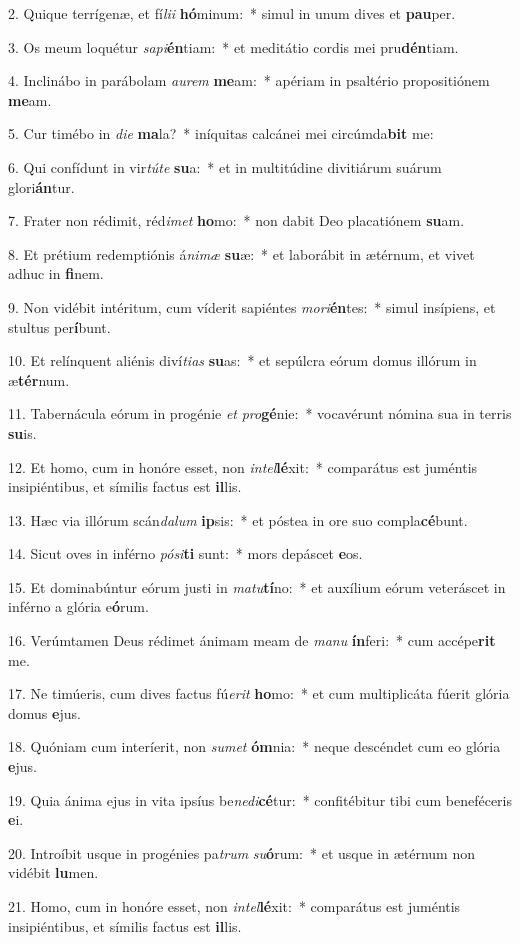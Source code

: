 2. Quique terrígenæ, et fí\textit{li}\textit{i} \textbf{hó}minum:~*  simul in unum dives et \textbf{pau}per.\

3. Os meum loquétur \textit{sa}\textit{pi}\textbf{én}tiam:~*  et meditátio cordis mei pru\textbf{dén}tiam.\

4. Inclinábo in parábolam \textit{au}\textit{rem} \textbf{me}am:~*  apériam in psaltério propositiónem \textbf{me}am.\

5. Cur timébo in \textit{di}\textit{e} \textbf{ma}la?~*  iníquitas calcánei mei circúmda\textbf{bit} me:\

6. Qui confídunt in vir\textit{tú}\textit{te} \textbf{su}a:~*  et in multitúdine divitiárum suárum glori\textbf{án}tur.\

7. Frater non rédimit, réd\textit{i}\textit{met} \textbf{ho}mo:~*  non dabit Deo placatiónem \textbf{su}am.\

8. Et prétium redemptiónis á\textit{ni}\textit{mæ} \textbf{su}æ:~*  et laborábit in ætérnum, et vivet adhuc in \textbf{fi}nem.\

9. Non vidébit intéritum, cum víderit sapiéntes \textit{mo}\textit{ri}\textbf{én}tes:~*  simul insípiens, et stultus per\textbf{í}bunt.\

10. Et relínquent aliénis diví\textit{ti}\textit{as} \textbf{su}as:~*  et sepúlcra eórum domus illórum in æ\textbf{tér}num.\

11. Tabernácula eórum in progénie \textit{et} \textit{pro}\textbf{gé}nie:~*  vocavérunt nómina sua in terris \textbf{su}is.\

12. Et homo, cum in honóre esset, non \textit{in}\textit{tel}\textbf{lé}xit:~*  comparátus est juméntis insipiéntibus, et símilis factus est \textbf{il}lis.\

13. Hæc via illórum scán\textit{da}\textit{lum} \textbf{ip}sis:~*  et póstea in ore suo compla\textbf{cé}bunt.\

14. Sicut oves in inférno \textit{pó}\textit{si}\textbf{ti} sunt:~*  mors depáscet \textbf{e}os.\

15. Et dominabúntur eórum justi in \textit{ma}\textit{tu}\textbf{tí}no:~*  et auxílium eórum veteráscet in inférno a glória e\textbf{ó}rum.\

16. Verúmtamen Deus rédimet ánimam meam de \textit{ma}\textit{nu} \textbf{ín}feri:~*  cum accépe\textbf{rit} me.\

17. Ne timúeris, cum dives factus fú\textit{e}\textit{rit} \textbf{ho}mo:~*  et cum multiplicáta fúerit glória domus \textbf{e}jus.\

18. Quóniam cum interíerit, non \textit{su}\textit{met} \textbf{óm}nia:~*  neque descéndet cum eo glória \textbf{e}jus.\

19. Quia ánima ejus in vita ipsíus be\textit{ne}\textit{di}\textbf{cé}tur:~*  confitébitur tibi cum beneféceris \textbf{e}i.\

20. Introíbit usque in progénies pa\textit{trum} \textit{su}\textbf{ó}rum:~*  et usque in ætérnum non vidébit \textbf{lu}men.\

21. Homo, cum in honóre esset, non \textit{in}\textit{tel}\textbf{lé}xit:~*  comparátus est juméntis insipiéntibus, et símilis factus est \textbf{il}lis.\

